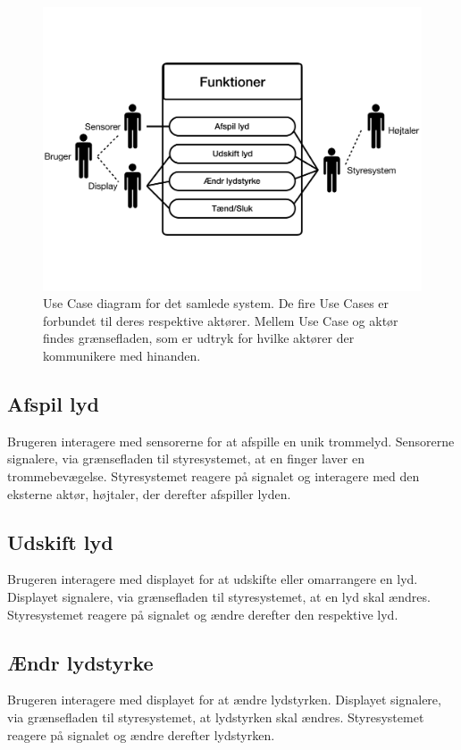 \begin{figure}
\centering
\includegraphics[scale=0.4]{Figure/protoUseCase}
\caption{
Use Case diagram for det samlede system. De fire Use Cases er forbundet til deres respektive aktører. Mellem Use Case og aktør findes grænsefladen, som er udtryk for hvilke aktører der kommunikere med hinanden.}
\label{fig:protoUseCase}
\end{figure}

\subsection{Afspil lyd}
Brugeren interagere med sensorerne for at afspille en unik trommelyd. Sensorerne signalere, via grænsefladen til styresystemet, at en finger laver en trommebevægelse. Styresystemet reagere på signalet og interagere med den eksterne aktør, højtaler, der derefter afspiller lyden.    

\subsection{Udskift lyd}
Brugeren interagere med displayet for at udskifte eller omarrangere en lyd. Displayet signalere, via grænsefladen til styresystemet, at en lyd skal ændres. Styresystemet reagere på signalet og ændre derefter den respektive lyd.   

\subsection{Ændr lydstyrke}
Brugeren interagere med displayet for at ændre lydstyrken. Displayet signalere, via grænsefladen til styresystemet, at lydstyrken skal ændres. Styresystemet reagere på signalet og ændre derefter lydstyrken. 

